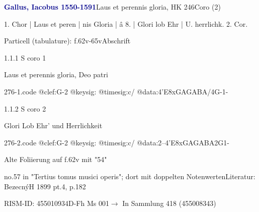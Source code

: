 \documentclass[twocolumn, 12pt]{book}
\begin{document}
\par \vspace{16pt} \textcolor{darkblue}{\textbf{Gallus, Iacobus  1550-1591}}\hfillplus{\textbf{[276]}}\newline Laus et perennis gloria, HK 246\newline Coro (2)
\par \begin{itshape}[f.62v, at left:] 1. Chor | Laus et peren | nis Gloria | â 8. | Glori lob Ehr | U. herrlichk. 2. Cor.\end{itshape} 
\par \textcolor{darkblue}{}  Particell (tabulature): f.62v-65v\newline Abschrift
\par 1.1.1  S coro 1\newline \begin{footnotesize} Laus et perennis gloria, Deo patri \end{footnotesize}  
\begin{filecontents*}{276-1.code}
@clef:G-2
@keysig:
@timesig:c/
@data:4'E{8xGA}{GABA}/4G-1-
\end{filecontents*}
\newline %
\par 1.1.2  S coro 2\newline \begin{footnotesize} Glori Lob Ehr' und Herrlichkeit \end{footnotesize}  
\begin{filecontents*}{276-2.code}
@clef:G-2
@keysig:
@timesig:c/
@data:2--4'E{8xGAGA}{BA}2G1-
\end{filecontents*}
\newline %
\par Alte Foliierung auf f.62v mit "54"
\par no.57 in "Tertius tomus musici operis"; dort mit doppelten Notenwerten\newline Literatur: BezecnýH 1899  pt.4, p.182
\par RISM-ID: 455010934\newline D-Fh  Ms 001\newline $\rightarrow$ In Sammlung 418 (455008343)
      
\end{document}
